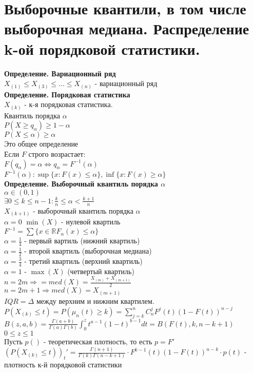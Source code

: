 \documentclass{article}
\newcommand\0{\mathbb{0}}
\newcommand\1{\mathbb{1}}
\begin{document}
\section{Выборочные квантили, в том числе выборочная медиана. Распределение k-ой порядковой
статистики.}
\textbf{Определение. Вариационный ряд}\\
$X_{(1)} \leq X_{(3)} \leq \dots \leq X_{(n)}$ - вариационный ряд\\
\textbf{Определение. Порядковая статистика}\\
$X_{(k)}$ - к-я порядковая статистика.\\
Квантиль порядка $\alpha$\\
$P(X \geq q_\alpha) \geq 1 - \alpha$\\
$P(X \leq \alpha) \geq \alpha$\\
Это общее определение\\
Если $F$ строго возрастает:\\
$F(q_\alpha) = \alpha \Leftrightarrow q_\alpha = F^{-1}(\alpha)$\\
$F^{-1}(\alpha): \sup\{x : F(x) \leq \alpha\}, \inf\{x : F(x) \geq \alpha\}$\\
\textbf{Определение. Выборочный квантиль порядка $\alpha$}\\
$\alpha \in (0,1)$\\
$\exists 0 \leq k \leq n - 1: \frac{k}{n} \leq \alpha < \frac{k + 1}{n}$\\
$X_{(k + 1)}$ - выборочный квантиль порядка $\alpha$\\
$\alpha = 0$ $\min(X)$ - нулевой квартиль\\
$F^{-1} = \sum\{x \in \mathbb{R} F_n(x) \leq \alpha\}$\\
$\alpha = \frac{1}{4}$ - первый вартиль (нижний квартиль)\\
$\alpha = \frac{1}{2}$ - второй квартиль (выборочная медиана)\\
$\alpha = \frac{3}{4}$ - третий квартиль (верхний квартиль)\\
$\alpha = 1$ - $\max(X)$ (четвертый квартиль)\\
$n = 2m \Rightarrow = med(X) = \frac{X_{(m)} + X_{(m + 1)}}{2}$\\
$n = 2m + 1 \Rightarrow med(X) = X_{(m + 1)}$\\
$IQR = \Delta$ между верхним и нижним квартилем.\\
$P(X_{(k)} \leq t) = P(\mu_n(t) \geq k) = \displaystyle\sum_{j = k}^n C_n^j F^j(t)(1 - F(t))^{n - j}$\\
$B(z,a,b) = \frac{\Gamma(a + b)}{\Gamma(a)\Gamma(b)} \displaystyle\int_0^z t^{a - 1}(1 - t)^{b - 1}dt = B(F(t),k,n - k + 1)$\\
$0 \leq z \leq 1$\\
Пусть $p()$ - теоретическая плотность, то есть $p = F'$\\
$(P(X_{(k)} \leq t))_t' = \frac{\Gamma(n + 1)}{\Gamma(k) \Gamma(n - k + 1)} \cdot F^{k - 1}(t)(1 - F(t))^{n - k} \cdot p(t)$ - плотность к-й порядковой статистики\\
\end{document}
